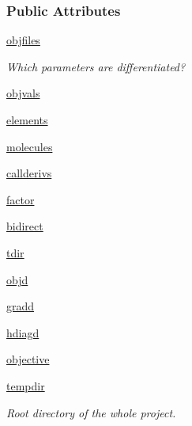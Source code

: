 \subsubsection*{\-Public \-Attributes}
\begin{DoxyCompactItemize}
\item 
\hyperlink{classforcebalance_1_1psi4io_1_1RDVR3__Psi4_af0a836ea0484e543c42795a4ac6f9aed}{objfiles}
\begin{DoxyCompactList}\small\item\em \-Which parameters are differentiated? \end{DoxyCompactList}\item 
\hyperlink{classforcebalance_1_1psi4io_1_1RDVR3__Psi4_ab49315aa4852cf9539f0f6f3a25c7318}{objvals}
\item 
\hyperlink{classforcebalance_1_1psi4io_1_1RDVR3__Psi4_ab845843d020ffd78521b595625fa56ef}{elements}
\item 
\hyperlink{classforcebalance_1_1psi4io_1_1RDVR3__Psi4_a42bd0c571fe52199a87c1130f918929b}{molecules}
\item 
\hyperlink{classforcebalance_1_1psi4io_1_1RDVR3__Psi4_a00806559809d8530de8733239a0b42d3}{callderivs}
\item 
\hyperlink{classforcebalance_1_1psi4io_1_1RDVR3__Psi4_aadc72cb33bd58393bbf7bd65498606c5}{factor}
\item 
\hyperlink{classforcebalance_1_1psi4io_1_1RDVR3__Psi4_a8c26d354891fd4b35233d0ce5cfe093f}{bidirect}
\item 
\hyperlink{classforcebalance_1_1psi4io_1_1RDVR3__Psi4_af469dd1fbd5c2542892e914dfb077433}{tdir}
\item 
\hyperlink{classforcebalance_1_1psi4io_1_1RDVR3__Psi4_a95a4c3d2b32efcbe00be45b60910ea89}{objd}
\item 
\hyperlink{classforcebalance_1_1psi4io_1_1RDVR3__Psi4_a81fffe9a1474f8b3fcb1c96659042cdb}{gradd}
\item 
\hyperlink{classforcebalance_1_1psi4io_1_1RDVR3__Psi4_adb55e09408b1ed17b5087a5362f25b40}{hdiagd}
\item 
\hyperlink{classforcebalance_1_1psi4io_1_1RDVR3__Psi4_ac0fdf394c51593f6836b4b771be7e700}{objective}
\item 
\hyperlink{classforcebalance_1_1target_1_1Target_aede2856573b890cd47054ad36937d6f6}{tempdir}
\begin{DoxyCompactList}\small\item\em \-Root directory of the whole project. \end{DoxyCompactList}\item 

\end{DoxyCompactItemize}
